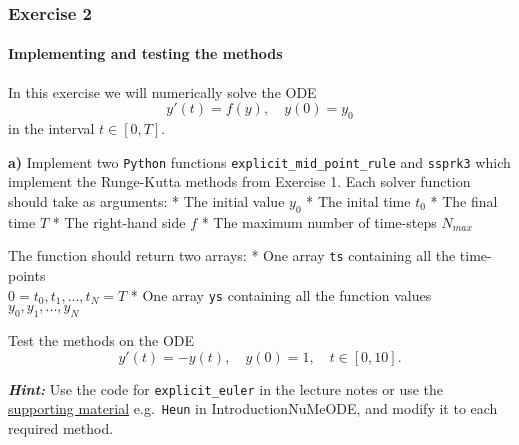 \documentclass[11pt]{article}
\begin{document}
    \hypertarget{exercise-2}{%
\subsubsection{\texorpdfstring{\textbf{Exercise
2}}{Exercise 2}}\label{exercise-2}}

\hypertarget{implementing-and-testing-the-methods}{%
\paragraph{Implementing and testing the
methods}\label{implementing-and-testing-the-methods}}

In this exercise we will numerically solve the ODE \[
y'(t) = f(y), \quad y(0) = y_0
\] in the interval \(t \in [0,T]\).

    \textbf{a)} Implement two \texttt{Python} functions
\texttt{explicit\_mid\_point\_rule} and \texttt{ssprk3} which implement
the Runge-Kutta methods from Exercise 1. Each solver function should
take as arguments: * The initial value \(y_0\) * The inital time \(t_0\)
* The final time \(T\) * The right-hand side \(f\) * The maximum number
of time-steps \(N_{max}\)

The function should return two arrays: * One array \texttt{ts}
containing all the time-points\\
\(0 = t_0,t_1,...,t_N = T\) * One array \texttt{ys} containing all the
function values\\
\(y_0,y_1,...,y_N\)

Test the methods on the ODE \[
y'(t) = -y(t), \quad y(0) = 1, \quad t \in [0,10].
\]

\emph{\textbf{Hint:}} Use the code for \texttt{explicit\_euler} in the
lecture notes or use the
\href{https://wiki.math.ntnu.no/tma4130/2021h/learning_material}{supporting
material} e.g.~\texttt{Heun} in IntroductionNuMeODE, and modify it to
each required method.
\end{document}
